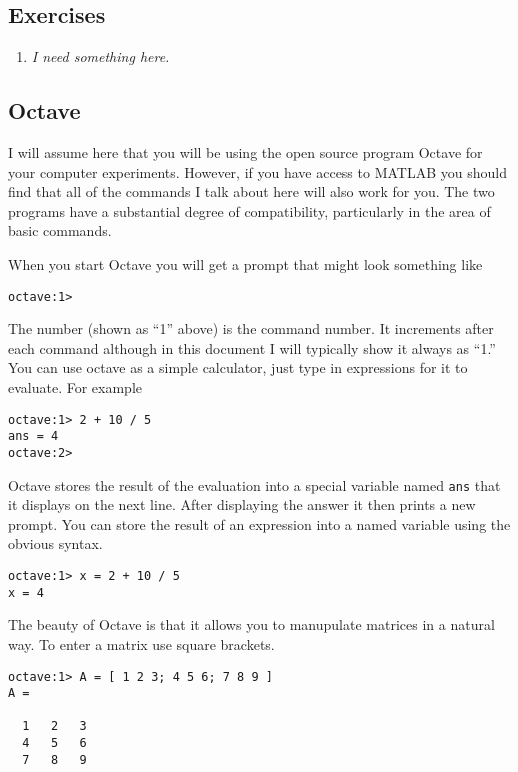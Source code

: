 \subsection*{Exercises}

\begin{enumerate}

\item \emph{I need something here.}

\end{enumerate}

\subsection*{Octave}

I will assume here that you will be using the open source program Octave for your computer
experiments. However, if you have access to MATLAB you should find that all of the commands I
talk about here will also work for you. The two programs have a substantial degree of
compatibility, particularly in the area of basic commands.

When you start Octave you will get a prompt that might look something like

\begin{verbatim}
octave:1>
\end{verbatim}

The number (shown as ``1'' above) is the command number. It increments after each command
although in this document I will typically show it always as ``1.'' You can use octave as a
simple calculator, just type in expressions for it to evaluate. For example

\begin{verbatim}
octave:1> 2 + 10 / 5
ans = 4
octave:2>
\end{verbatim}

Octave stores the result of the evaluation into a special variable named \texttt{ans} that it
displays on the next line. After displaying the answer it then prints a new prompt. You can
store the result of an expression into a named variable using the obvious syntax.

\begin{verbatim}
octave:1> x = 2 + 10 / 5
x = 4
\end{verbatim}

The beauty of Octave is that it allows you to manupulate matrices in a natural way. To enter a
matrix use square brackets.

\begin{verbatim}
octave:1> A = [ 1 2 3; 4 5 6; 7 8 9 ]
A =

  1   2   3
  4   5   6
  7   8   9
\end{verbatim}

